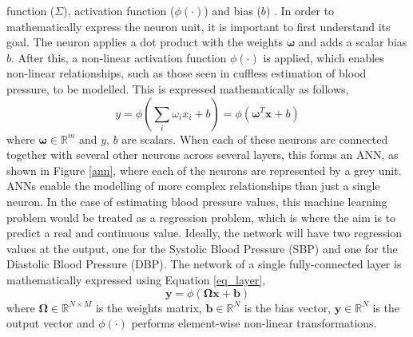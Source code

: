  function ($\Sigma$), activation function ($\phi(\cdot)$) and bias ($b$) \cite{deeplearning}. In order to mathematically 
 express the neuron unit, it is important to first understand its goal. The neuron
 applies a dot product with the weights $\bm{\omega}$ and 
adds a scalar bias $b$. After this, a non-linear 
activation function $\phi(\cdot)$ is applied, which enables non-linear relationships, such as those 
seen in cuffless estimation of blood pressure, to be modelled. This is expressed mathematically as follows,
\begin{equation}\label{eq_neuron}
    y = \phi(\sum_{i} \omega_i x_i + b ) = \phi (\bm{\omega}^T \mathbf{x} + b)
\end{equation}\noindent where $\bm{\omega} \in \mathbb{R}^m$ 
and $y$, $b$ are scalars. When each of these neurons are connected together with several other 
neurons across several layers, this forms an ANN, as shown in Figure \ref{ann}, where each of the 
neurons are represented by a grey unit. ANNs enable the modelling of more 
complex relationships than just a single neuron. In the case of estimating blood pressure values, this machine learning problem would be treated 
as a regression problem, which is where the aim is to predict a real and continuous value. Ideally, the network will have two regression values 
at the output, one for the Systolic Blood Pressure (SBP) and one for the Diastolic Blood Pressure (DBP). The network of a single fully-connected layer is mathematically expressed using Equation \ref{eq_layer}, 
\begin{equation}\label{eq_layer}
    \mathbf{y} = \phi (\bm{\Omega} \mathbf{x} + \mathbf{b})
\end{equation}\noindent where $\bm{\Omega} \in \mathbb{R}^{N \times M}$ is the weights matrix, 
$\mathbf{b} \in \mathbb{R}^N$ is the bias vector, $\mathbf{y} \in \mathbb{R}^N$ is the output 
vector and $\phi(\cdot)$ performs element-wise non-linear transformations.

